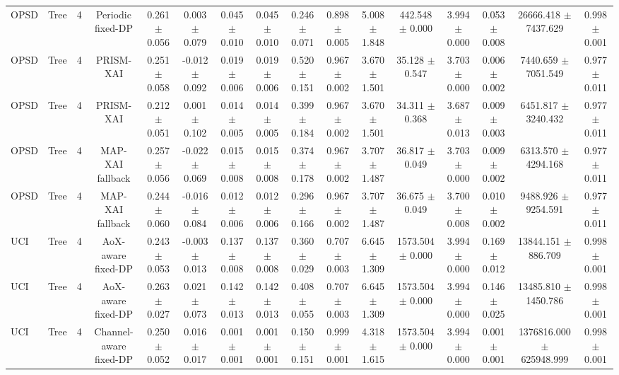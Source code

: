 \begin{tabular}{lccccccccccccccc}
OPSD & Tree & 4 & Periodic fixed-DP & 0.261 $\pm$ 0.056 & 0.003 $\pm$ 0.079 & 0.045 $\pm$ 0.010 & 0.045 $\pm$ 0.010 & 0.246 $\pm$ 0.071 & 0.898 $\pm$ 0.005 & 5.008 $\pm$ 1.848 & 442.548 $\pm$ 0.000 & 3.994 $\pm$ 0.000 & 0.053 $\pm$ 0.008 & 26666.418 $\pm$ 7437.629 & 0.998 $\pm$ 0.001 \\
OPSD & Tree & 4 & PRISM-XAI & 0.251 $\pm$ 0.058 & -0.012 $\pm$ 0.092 & 0.019 $\pm$ 0.006 & 0.019 $\pm$ 0.006 & 0.520 $\pm$ 0.151 & 0.967 $\pm$ 0.002 & 3.670 $\pm$ 1.501 & 35.128 $\pm$ 0.547 & 3.703 $\pm$ 0.000 & 0.006 $\pm$ 0.002 & 7440.659 $\pm$ 7051.549 & 0.977 $\pm$ 0.011 \\
OPSD & Tree & 4 & PRISM-XAI & 0.212 $\pm$ 0.051 & 0.001 $\pm$ 0.102 & 0.014 $\pm$ 0.005 & 0.014 $\pm$ 0.005 & 0.399 $\pm$ 0.184 & 0.967 $\pm$ 0.002 & 3.670 $\pm$ 1.501 & 34.311 $\pm$ 0.368 & 3.687 $\pm$ 0.013 & 0.009 $\pm$ 0.003 & 6451.817 $\pm$ 3240.432 & 0.977 $\pm$ 0.011 \\
OPSD & Tree & 4 & MAP-XAI fallback & 0.257 $\pm$ 0.056 & -0.022 $\pm$ 0.069 & 0.015 $\pm$ 0.008 & 0.015 $\pm$ 0.008 & 0.374 $\pm$ 0.178 & 0.967 $\pm$ 0.002 & 3.707 $\pm$ 1.487 & 36.817 $\pm$ 0.049 & 3.703 $\pm$ 0.000 & 0.009 $\pm$ 0.002 & 6313.570 $\pm$ 4294.168 & 0.977 $\pm$ 0.011 \\
OPSD & Tree & 4 & MAP-XAI fallback & 0.244 $\pm$ 0.060 & -0.016 $\pm$ 0.084 & 0.012 $\pm$ 0.006 & 0.012 $\pm$ 0.006 & 0.296 $\pm$ 0.166 & 0.967 $\pm$ 0.002 & 3.707 $\pm$ 1.487 & 36.675 $\pm$ 0.049 & 3.700 $\pm$ 0.008 & 0.010 $\pm$ 0.002 & 9488.926 $\pm$ 9254.591 & 0.977 $\pm$ 0.011 \\
UCI & Tree & 4 & AoX-aware fixed-DP & 0.243 $\pm$ 0.053 & -0.003 $\pm$ 0.013 & 0.137 $\pm$ 0.008 & 0.137 $\pm$ 0.008 & 0.360 $\pm$ 0.029 & 0.707 $\pm$ 0.003 & 6.645 $\pm$ 1.309 & 1573.504 $\pm$ 0.000 & 3.994 $\pm$ 0.000 & 0.169 $\pm$ 0.012 & 13844.151 $\pm$ 886.709 & 0.998 $\pm$ 0.001 \\
UCI & Tree & 4 & AoX-aware fixed-DP & 0.263 $\pm$ 0.027 & 0.021 $\pm$ 0.073 & 0.142 $\pm$ 0.013 & 0.142 $\pm$ 0.013 & 0.408 $\pm$ 0.055 & 0.707 $\pm$ 0.003 & 6.645 $\pm$ 1.309 & 1573.504 $\pm$ 0.000 & 3.994 $\pm$ 0.000 & 0.146 $\pm$ 0.025 & 13485.810 $\pm$ 1450.786 & 0.998 $\pm$ 0.001 \\
UCI & Tree & 4 & Channel-aware fixed-DP & 0.250 $\pm$ 0.052 & 0.016 $\pm$ 0.017 & 0.001 $\pm$ 0.001 & 0.001 $\pm$ 0.001 & 0.150 $\pm$ 0.151 & 0.999 $\pm$ 0.001 & 4.318 $\pm$ 1.615 & 1573.504 $\pm$ 0.000 & 3.994 $\pm$ 0.000 & 0.001 $\pm$ 0.001 & 1376816.000 $\pm$ 625948.999 & 0.998 $\pm$ 0.001 \\

\end{tabular}
